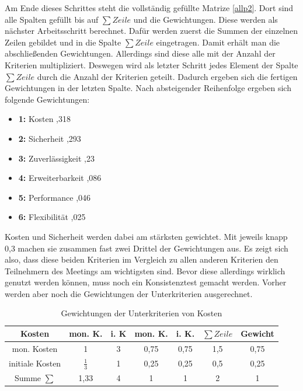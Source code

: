 Am Ende dieses Schrittes steht die vollständig gefüllte Matrize \ref{allp2}. Dort sind alle Spalten gefüllt bis auf $\sum Zeile$ und die Gewichtungen. Diese werden als nächster Arbeitsschritt berechnet. Dafür werden zuerst die Summen der einzelnen Zeilen gebildet und in die Spalte $\sum Zeile$ eingetragen. Damit erhält man die abschließenden Gewichtungen. Allerdings sind diese alle mit der Anzahl der Kriterien multipliziert. Deswegen wird als letzter Schritt jedes Element der Spalte $\sum Zeile$ durch die Anzahl der Kriterien geteilt. Dadurch ergeben sich die fertigen Gewichtungen in der letzten Spalte. Nach absteigender Reihenfolge ergeben sich folgende Gewichtungen:
\begin{itemize}
	\item \textbf{1:} Kosten \enspace\dotfill{},318\enspace\enspace\enspace
	\item \textbf{2:} Sicherheit \enspace\dotfill{},293\enspace\enspace\enspace
	\item \textbf{3:} Zuverlässigkeit \enspace\dotfill{},23\enspace\enspace\enspace
	\item \textbf{4:} Erweiterbarkeit \enspace\dotfill{},086\enspace\enspace\enspace
	\item \textbf{5:} Performance \enspace\dotfill{},046\enspace\enspace\enspace
	\item \textbf{6:} Flexibilität \enspace\dotfill{},025\enspace\enspace\enspace
\end{itemize}
Kosten und Sicherheit werden dabei am stärksten gewichtet. Mit jeweils knapp 0,3 machen sie zusammen fast zwei Drittel der Gewichtungen aus. Es zeigt sich also, dass diese beiden Kriterien im Vergleich zu allen anderen Kriterien den Teilnehmern des Meetings am wichtigsten sind. Bevor diese allerdings wirklich genutzt werden können, muss noch ein Konsistenztest gemacht werden. Vorher werden aber noch die Gewichtungen der Unterkriterien ausgerechnet. 
\begin{table}[h!]
	\centering
	\begin{tabular}{c|cc|cc|c|c}
		Kosten            & mon. K. & i. K & mon. K.& i. K.&$\sum Zeile$& Gewicht\\ 
		\hline
		mon. Kosten & 1                &          3    &  0,75  &0,75 & 1,5&0,75\\
		initiale Kosten   &     $\frac{1}{3}$           & 1   &0,25  & 0,25& 0,5&0,25\\
		\hline
		Summe $\sum$    &  		1,33			&   4        & 1&1 &2 &1
	\end{tabular}
	\caption{Gewichtungen der Unterkriterien von Kosten}
	\label{cost2}
\end{table}\\
